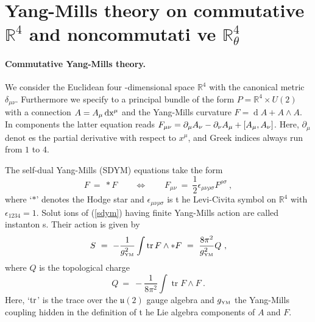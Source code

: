\documentclass[a4paper,11pt,english]{article}
\numberwithin{equation}{section}
\newcommand{\D}[1]{\operatorname{d#1}}
\newcommand{\tr}[1]{\operatorname{tr}#1}
\newcommand{\sfrac}[2]{{\textstyle\frac{#1}{#2}}}
\renewcommand{\=}{\ =\ }
\begin{document}

\section{Yang-Mills theory on commutative $\mathbb{R}^4$ and noncommutati%
ve $\mathbb{R}^4_{\theta}$}

\paragraph{Commutative Yang-Mills theory.} We consider the Euclidean four%
-dimensional space $\mathbb{R}^4$ with the canonical metric $\delta_{\mu
\nu}$. Furthermore we specify to a principal bundle of the form $P=\mathbb{R%
}^4\times U(2)$ with a connection ${A}={A}_{\mu}\D{x^%
\mu}$ and the Yang-Mills curvature ${F}=\D{}{A}+%
{A}\wedge{A}$. In components the latter equation reads $%
{F}_{\mu\nu}=\partial_{\mu}{A}_{\nu}-\partial_{\nu}{A}_%
{\mu}+[{A}_{\mu},{A}_{\nu}]$. Here, $\partial_{\mu}$ denot%
es the partial derivative with respect to $x^\mu$, and Greek 
indices always run from $1$ to $4$.

The self-dual Yang-Mills (SDYM) equations take the form
\begin{equation}\label{sdym}
 {F}\=*{F}\qquad\Longleftrightarrow\qquad{F}_{\mu\nu%
}\=\sfrac{1}{2}\epsilon_{\mu\nu\rho\sigma}{F}^{\rho\sigma}\ ,
\end{equation}
where `$*$' denotes the Hodge star and $\epsilon_{\mu\nu\rho\sigma}$ is t%
he Levi-Civita symbol on $\mathbb{R}^4$ with $\epsilon_{1234}=1$. Solut%
ions of (\ref{sdym}) having finite Yang-Mills action are called instanton%
s. Their action is given by
\begin{equation}\label{action}
 S \= -\frac{1}{g^2_{\text{\tiny YM}}}\int\tr {F}\wedge{*%
{F}}\=\frac{8\pi^2}{g^2_{\text{\tiny YM}}}Q\ ,
\end{equation}
where $Q$ is the topological charge
\begin{equation}
 Q \= -\frac{1}{8\pi^2}\int\tr {F}\wedge{F}\ .
\end{equation}
Here, `$\tr$' is the trace over the $\mathfrak{u}(2)$ gauge algebra and $g%
_{\text{\tiny YM}}$ the Yang-Mills coupling hidden in the definition of t%
he Lie algebra components of ${A}$ and ${F}$.
\end{document}
